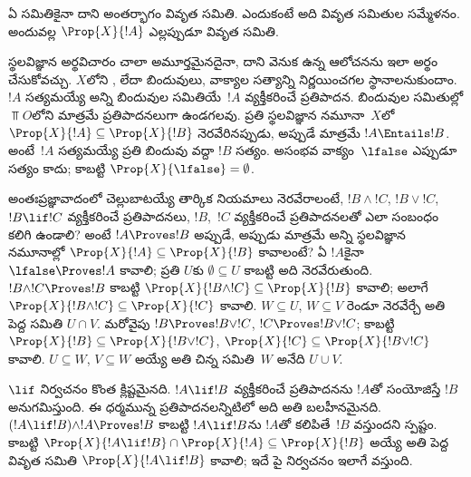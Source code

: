 \documentclass[../../../include/open-logic-section]{subfiles}
\begin{document}
ఏ సమితికైనా దాని అంతర్భాగం వివృత సమితి.
ఎందుకంటే అది వివృత సమితుల సమ్మేళనం. అందువల్ల
$\Prop{X}{!A}$ ఎల్లప్పుడూ వివృత సమితి.

స్థలవిజ్ఞాన అర్థవిచారం చాలా అమూర్తమైనదైనా,
దాని వెనుక ఉన్న ఆలోచనను ఇలా అర్థం చేసుకోవచ్చు.
$X$లోని ,
లేదా బిందువులు, వాక్యాల సత్యాన్ని నిర్ణయించగల స్థానాలనుకుందాం. $!A$ సత్యమయ్యే
అన్ని బిందువుల సమితియే~$!A$ వ్యక్తీకరించే
ప్రతిపాదన. బిందువుల సమితుల్లో $\Top{O}$లోని
 మాత్రమే ప్రతిపాదనలుగా ఉండగలవు.
ప్రతి స్థలవిజ్ఞాన నమూనా~$X$లో $\Prop{X}{!A}
\subseteq \Prop{X}{!B}$ నెరవేరినప్పుడు, అప్పుడే మాత్రమే $!A \Entails !B$.
అంటే~$!A$ సత్యమయ్యే ప్రతి బిందువు వద్దా $!B$ సత్యం. అసంభవ వాక్యం~$\lfalse$
ఎప్పుడూ సత్యం కాదు; కాబట్టి
$\Prop{X}{\lfalse} = \emptyset$.

అంతఃప్రజ్ఞావాదంలో చెల్లుబాటయ్యే తార్కిక నియమాలు
నెరవేరాలంటే, $!B \land !C$, $!B \lor !C$,
$!B \lif !C$ వ్యక్తీకరించే ప్రతిపాదనలు,
$!B$,~$!C$ వ్యక్తీకరించే ప్రతిపాదనలతో ఎలా సంబంధం కలిగి ఉండాలి?
అంటే $!A \Proves
!B$ అప్పుడే, అప్పుడు మాత్రమే అన్ని స్థలవిజ్ఞాన నమూనాల్లో
$\Prop{X}{!A} \subseteq \Prop{X}{!B}$
కావాలంటే? ఏ $!A$కైనా $\lfalse
\Proves !A$ కావాలి; ప్రతి $U$కు $\emptyset
\subseteq U$ కాబట్టి అది నెరవేరుతుంది.
$!B \land !C \Proves !B$ కాబట్టి
$\Prop{X}{!B \land !C} \subseteq \Prop{X}{!B}$
కావాలి; అలాగే $\Prop{X}{!B \land !C}
\subseteq \Prop{X}{!C}$ కావాలి. $W \subseteq U$,
$W \subseteq V$ రెండూ నెరవేర్చే అతి పెద్ద
సమితి $U \cap V$. మరోవైపు
$!B \Proves !B \lor !C$, $!C \Proves !B \lor !C$;
కాబట్టి $\Prop{X}{!B} \subseteq \Prop{X}{!B \lor !C}$,
$\Prop{X}{!C} \subseteq \Prop{X}{!B \lor !C}$
కావాలి. $U \subseteq W$, $V \subseteq W$
అయ్యే అతి చిన్న సమితి~$W$ అనేది $U \cup V$.

$\lif$ నిర్వచనం కొంత క్లిష్టమైనది. $!A \lif !B$
వ్యక్తీకరించే ప్రతిపాదనను $!A$తో సంయోజిస్తే
$!B$ అనుగమిస్తుంది. ఈ ధర్మమున్న ప్రతిపాదనలన్నిటిలో
అది అతి బలహీనమైనది.
$(!A \lif !B)
\land !A \Proves !B $ కాబట్టి $!A
\lif !B$ను $!A$తో కలిపితే~$!B$ వస్తుందని
స్పష్టం. కాబట్టి $\Prop{X}{!A \lif !B} \cap \Prop{X}{!A}
\subseteq \Prop{X}{!B}$ అయ్యే అతి పెద్ద వివృత
సమితి $\Prop{X}{!A \lif !B}$ కావాలి; ఇదే
పై నిర్వచనం ఇలాగే వస్తుంది.
\end{document}
